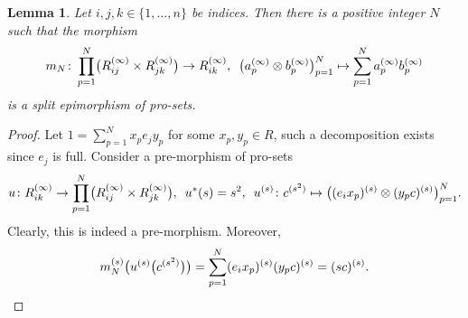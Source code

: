 \documentclass{article}
\newtheorem{lemma}{Lemma}
\newcommand{\rar}{\rightarrow}
\begin{document}
\begin{lemma}\label{RingGeneration}
Let \(i, j, k \in \{1, \ldots, n\}\) be indices. Then there is a positive integer \(N\) such that the morphism 
\[m_N \colon \prod_{p = 1}^N \bigl(R_{ij}^{(\infty)} \times R_{jk}^{(\infty)}\bigr) \rar R_{ik}^{(\infty)}, \enskip \bigl(a_p^{(\infty)} \otimes b_p^{(\infty)}\bigr)_{p = 1}^N \mapsto \sum_{p = 1}^N a_p^{(\infty)} b_p^{(\infty)}\]
is a split epimorphism of pro-sets.
\end{lemma}
\begin{proof}
Let \(1 = \sum_{p = 1}^N x_p e_j y_p\) for some \(x_p, y_p \in R\), such a decomposition exists since \(e_j\) is full. Consider a pre-morphism of pro-sets
\[u \colon R^{(\infty)}_{ik} \rar \prod_{p = 1}^N \bigl(R^{(\infty)}_{ij} \times R^{(\infty)}_{jk}\bigr), \enskip u^*(s) = s^2, \enskip u^{(s)} \colon c^{(s^2)} \mapsto \bigl((e_i x_p)^{(s)} \otimes (y_p c)^{(s)}\bigr)_{p = 1}^N.\]
Clearly, this is indeed a pre-morphism. Moreover,
\[
m_N^{(s)}\bigl(u^{(s)}\bigl(c^{(s^2)}\bigr)\bigr) = \sum_{p = 1}^N (e_i x_p)^{(s)} (y_p c)^{(s)} = (sc)^{(s)}.\qedhere
\]
\end{proof}
\end{document}
